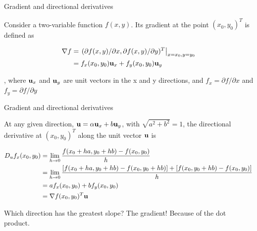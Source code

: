 \documentclass[notes]{beamer}
\begin{document}
\begin{frame}{Gradient and directional derivatives}

Consider a two-variable function \(f(x,y)\). Its gradient at the point
\((x_0 ,y_0)^T\) is defined as

\begin{equation*}
    \begin{aligned}
        \nabla f & = \left. (\partial f(x,y) / \partial x , \partial f(x,y) / \partial y)^T \right|_{x=x_0,y=y_0}   \\ 
        & = f_x(x_0,y_0) \mathbf{u}_x + f_y(x_0,y_0) \mathbf{u}_y 
    \end{aligned}
\end{equation*}

, where \(\mathbf{u}_x\) and \(\mathbf{u}_y\) are unit vectors in the x and y
directions, and \(f_x=\partial f / \partial x\) and
\(f_y = \partial f / \partial y\)

\end{frame}

\begin{frame}{Gradient and directional derivatives}

At any given direction, \(\mathbf{u} = \alpha \mathbf{u}_x + b \mathbf{u}_y\), with
\(\sqrt{a^2+b^2}=1\), the directional derivative at \((x_0, y_0 )^T\)
along the unit vector \(\mathbf{u}\) is

\begin{equation*}
    \begin{aligned}
        D_u f_x(x_0,y_0) &= \lim_{h \rightarrow 0} \frac{f(x_0 + ha, y_0+hb)-f(x_0,y_0) }{h} \\  
        &= \lim_{h \rightarrow 0} \frac{[f(x_0+ha , y_0 +hb)-f(x_0,y_0+hb)]+[f(x_0,y_0+hb)-f(x_0,y_0)]}{h} \\
        &= af_x(x_0,y_0)+bf_y(x_0,y_0) \\
        &= \nabla f(x_0,y_0)^T \mathbf{u}
    \end{aligned}
\end{equation*}

Which direction has the greatest slope? The gradient! Because of the dot
product.

\end{frame}
\end{document}
